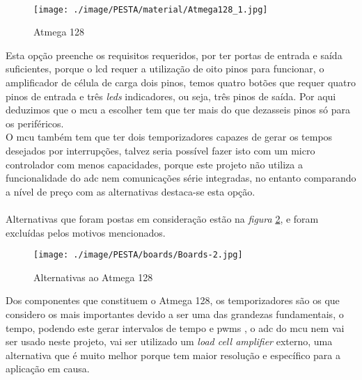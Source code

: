 \\
\begin{figure}[H]
	\centering
	\texttt{[image: ./image/PESTA/material/Atmega128\_1.jpg]}
	\caption{Atmega 128}
	\label{Atmega_128_pinagem}
\end{figure}
Esta opção preenche os requisitos requeridos, por ter portas de entrada e saída suficientes, porque o \acs{lcd} requer a utilização de oito pinos para funcionar, o amplificador de célula de carga dois pinos, temos quatro botões que requer quatro pinos de entrada e três \textit{leds} indicadores, ou seja, três pinos de saída. Por aqui deduzimos que o \acs{mcu} a escolher tem que ter mais do que dezasseis pinos só para os periféricos.
\\
O \acs{mcu} também tem que ter dois temporizadores capazes de gerar os tempos desejados por interrupções, talvez seria possível fazer isto com um micro controlador com menos capacidades, porque este projeto não utiliza a funcionalidade do \acs{adc} nem comunicações série integradas, no entanto comparando a nível de preço com as alternativas destaca-se esta opção.
\\
\\
Alternativas que foram postas em consideração estão na \textit{figura} \ref{Boards-1}, e foram excluídas pelos motivos mencionados.
\\
\begin{figure}[H]
	\centering
	\texttt{[image: ./image/PESTA/boards/Boards-2.jpg]}
	\caption{Alternativas ao Atmega 128}
	\label{Boards-1}
\end{figure}
Dos componentes que constituem o Atmega 128, os temporizadores são os que considero os mais importantes devido a ser uma das grandezas fundamentais, o tempo, podendo este gerar intervalos de tempo e \acp{pwm}
, o \ac{adc} do \acs{mcu} nem vai ser usado neste projeto, vai ser utilizado um \textit{load cell amplifier} externo, uma alternativa que é muito melhor porque tem maior resolução e específico para a aplicação em causa.
\\
\\
